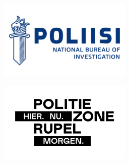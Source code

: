\documentclass{beamer}
\begin{document}
\begin{frame}
{{\begin{minipage}{.15\textwidth}\includegraphics[width=\columnwidth]{../img/logo_nbi.png}\end{minipage}%
\begin{minipage}{.15\textwidth}\includegraphics[width=\columnwidth]{../img/logo_lpr.png}\end{minipage}%
}
}

\end{frame}
\end{document}
